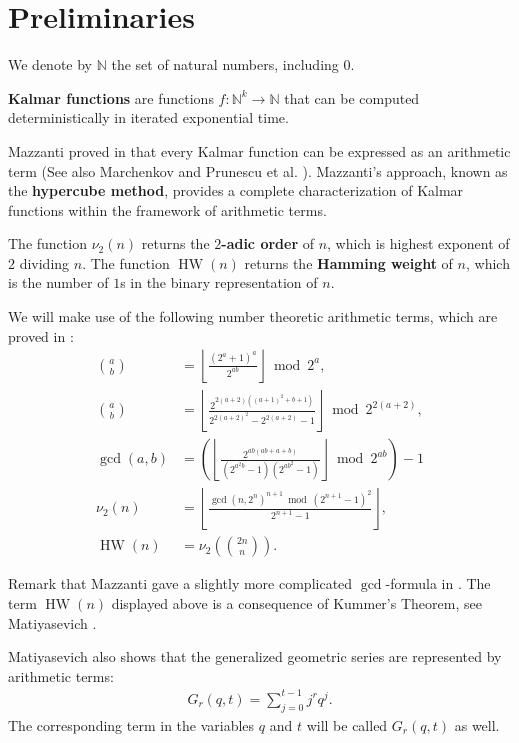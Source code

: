 \documentclass[10pt]{article}
\theoremstyle{plain}
\newcommand{\floor}[1]{\left\lfloor #1 \right\rfloor}
\newcommand{\HW}{\operatorname{HW}}
\begin{document}
\section{Preliminaries}\label{sectionpreliminaries}
We denote by $\mathbb{N}$ the set of natural numbers, including $0$.

{\bf Kalmar functions} are functions $f : \mathbb{N}^k \to \mathbb{N}$ that can be computed deterministically in iterated exponential time.

Mazzanti proved in \cite{mazzanti2002plainbases} that every Kalmar function can be expressed as an arithmetic term (See also Marchenkov \cite{marchenkov2007superposition} and Prunescu et al. \cite{prunescu2025minimalsubstitutionbasiskalmar}). Mazzanti's approach, known as the \textbf{hypercube method}, provides a complete characterization of Kalmar functions within the framework of arithmetic terms.

The function $\nu_2(n)$ returns the \textbf{$2$-adic order} of $n$, which is highest exponent of $2$ dividing $n$. The function $\HW(n)$ returns the \textbf{Hamming weight} of $n$, which is the number of $1$s in the binary representation of $n$.

We will make use of the following number theoretic arithmetic terms, which are proved in \cite{mazzanti2002plainbases, marchenkov2007superposition, prunescushunia2024gcd, prunescushunia2024primes}:
\begin{align*}
\binom{a}{b} &= \floor{\frac{(2^a+1)^a}{2^{ab}}} \bmod 2^a , \\
\binom{a}{b} &= \floor{\frac{2^{2(a+2)((a+1)^2+b+1)}}{2^{2(a+2)^2} - 2^{2(a+2)} - 1}} \bmod 2^{2(a+2)} ,\\
\gcd(a,b) &= \left ( \floor{\frac{2^{ ab(ab + a + b)}}{(2^{a^2 b} - 1)(2^{ab^2}-1)}} \bmod 2^{ab} \right ) - 1 \\
\nu_2(n) &= \floor{\frac{\gcd(n, 2^n)^{n+1} \bmod (2^{n+1}-1)^2}{2^{n+1}-1}} , \\
\HW(n) &= \nu_2\left(\binom{2n}{n}\right) .
\end{align*}

 Remark that Mazzanti gave a slightly more complicated $\gcd$-formula in \cite{mazzanti2002plainbases}.  The term $\HW(n)$ displayed above is a consequence of Kummer's Theorem, see Matiyasevich \citep[Appendix]{matiyasevich1993hilbert}.

Matiyasevich also shows that the generalized geometric series are represented by arithmetic terms:
\begin{align}
G_r (q, t) = \sum_{j=0}^{t-1} j^r q^j .
\end{align}
The corresponding term in the variables $q$ and $t$ will be called $G_r(q, t)$ as well.
\end{document}

